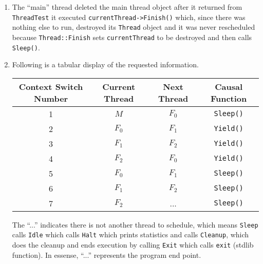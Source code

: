 \documentclass[letterpaper, 10pt]{article}
\begin{document}
\begin{enumerate}
	\item{
	The ``main'' thread deleted the main thread object after it returned from {\tt ThreadTest} it executed {\tt currentThread->Finish()} which, since there was nothing else to run, destroyed its {\tt Thread} object and it was never rescheduled because {\tt Thread::Finish} sets {\tt currentThread} to be destroyed and then calls {\tt Sleep()}.
	}

	\item{

	Following is a tabular display of the requested information.

	\begin{tabular}{| c | c | c | c |}
		\hline
		Context Switch Number & Current Thread & Next Thread & Causal Function \\\hline
		\hline
		1 & $M$ & $F_{0}$ & {\tt Sleep()} \\ \hline
		2 & $F_{0}$ & $F_{1}$ & {\tt Yield()} \\ \hline
		3 & $F_{1}$ & $F_{2}$ & {\tt Yield()} \\ \hline
		4 & $F_{2}$ & $F_{0}$ & {\tt Yield()} \\ \hline
		5 & $F_{0}$ & $F_{1}$ & {\tt Sleep()} \\ \hline
		6 & $F_{1}$ & $F_{2}$ & {\tt Sleep()} \\ \hline
		7 & $F_{2}$ & ... & {\tt Sleep()} \\ \hline
	\end{tabular}

	The ``...'' indicates there is not another thread to schedule, which means {\tt Sleep} calls {\tt Idle} which calls {\tt Halt} which prints statistics and calls {\tt Cleanup}, which does the cleanup and ends execution by calling {\tt Exit} which calls {\tt exit} (stdlib function). In essense, ``...'' represents the program end point.
	}

	\end{enumerate}
\end{document}
